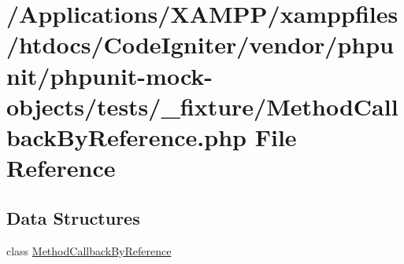 \hypertarget{_method_callback_by_reference_8php}{}\section{/\+Applications/\+X\+A\+M\+P\+P/xamppfiles/htdocs/\+Code\+Igniter/vendor/phpunit/phpunit-\/mock-\/objects/tests/\+\_\+fixture/\+Method\+Callback\+By\+Reference.php File Reference}
\label{_method_callback_by_reference_8php}
\subsection*{Data Structures}
\begin{DoxyCompactItemize}
\item 
class \mbox{\hyperlink{class_method_callback_by_reference}{Method\+Callback\+By\+Reference}}
\end{DoxyCompactItemize}
